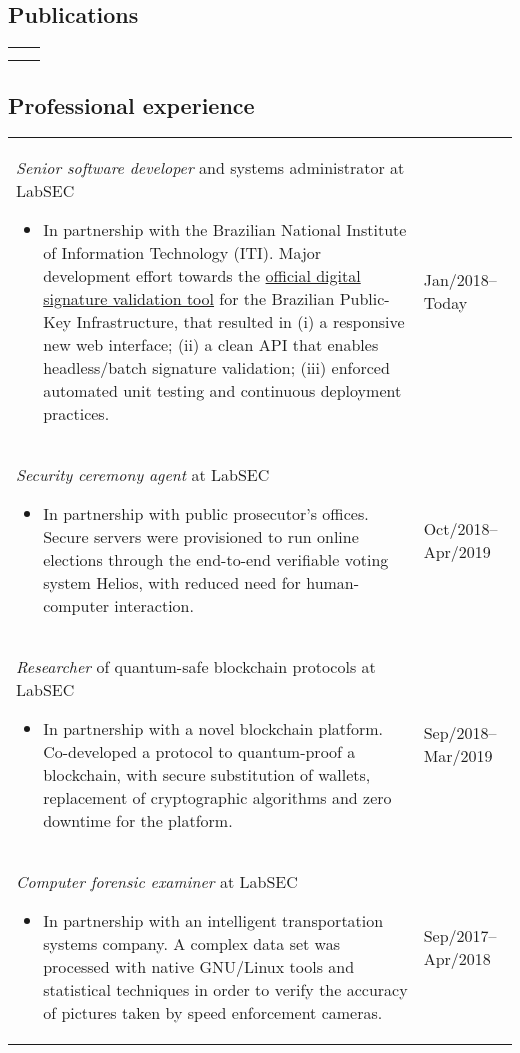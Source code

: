 \documentclass[12pt]{article}
\makeatletter
\newenvironment{datetable}
  {\newcolumntype{R}{>{\raggedleft\arraybackslash}p{0.14\textwidth}}
   \newcolumntype{L}{p{0.82\textwidth}}
   \begin{tabular}{@{\hspace{0mm}}LR}}
  {\end{tabular}}
\newenvironment{contenttable}[1]
  {\subsection*{#1}
   \begin{datetable}}
  {\end{datetable}}
\makeatother
\begin{document}
\begin{contenttable}{Publications}
  \hspace{0mm} \\
   \\
\end{contenttable}

\begin{contenttable}{Professional experience}
  \emph{Senior software developer} and systems administrator at LabSEC
  \begin{itemize}
    \item In partnership with the Brazilian National Institute of Information
        Technology (ITI). Major development effort towards the
          \href{https://verificador.iti.gov.br}{official digital signature
          validation tool} for the Brazilian Public-Key Infrastructure, that
          resulted in (i) a responsive new web interface; (ii) a clean API that
          enables headless/batch signature validation; (iii) enforced automated
          unit testing and continuous deployment practices.
  \end{itemize} & Jan/2018--Today \\

  \emph{Security ceremony agent} at LabSEC
  \begin{itemize}
    \item In partnership with public prosecutor's offices. Secure servers were
        provisioned to run online elections through the end-to-end verifiable
          voting system Helios, with reduced need for human-computer
          interaction.
  \end{itemize} & Oct/2018--Apr/2019 \\

  \emph{Researcher} of quantum-safe blockchain protocols at LabSEC
  \begin{itemize}
    \item In partnership with a novel blockchain platform. Co-developed a
        protocol to quantum-proof a blockchain, with secure substitution of
          wallets, replacement of cryptographic algorithms and zero downtime
          for the platform.
  \end{itemize} & Sep/2018--Mar/2019 \\

  \emph{Computer forensic examiner} at LabSEC
  \begin{itemize}
    \item In partnership with an intelligent transportation systems company. A
        complex data set was processed with native GNU/Linux tools and
          statistical techniques in order to verify the accuracy of pictures
          taken by speed enforcement cameras.
  \end{itemize} & Sep/2017--Apr/2018 \\


\end{contenttable}
\end{document}
